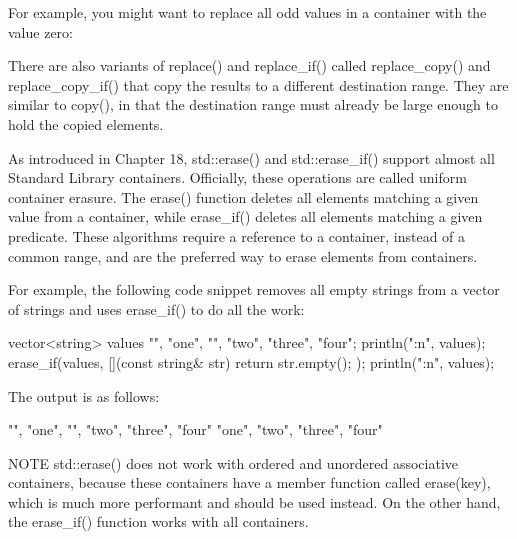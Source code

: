 For example, you might want to replace all odd values in a container with the value zero:


There are also variants of replace() and replace\_if() called replace\_copy() and replace\_copy\_if() that copy the results to a different destination range. They are similar to copy(), in that the destination range must already be large enough to hold the copied elements.


As introduced in Chapter 18, std::erase() and std::erase\_if() support almost all Standard Library containers. Officially, these operations are called uniform container erasure. The erase() function deletes all elements matching a given value from a container, while erase\_if() deletes all elements matching a given predicate. These algorithms require a reference to a container, instead of a common range, and are the preferred way to erase elements from containers.

For example, the following code snippet removes all empty strings from a vector of strings and uses erase\_if() to do all the work:

\begin{cpp}
vector<string> values {"", "one", "", "two", "three", "four"};
println("{:n}", values);
erase_if(values, [](const string& str){ return str.empty(); });
println("{:n}", values);
\end{cpp}

The output is as follows:

\begin{shell}
"", "one", "", "two", "three", "four"
"one", "two", "three", "four"
\end{shell}

\begin{myNotic}{NOTE}
std::erase() does not work with ordered and unordered associative containers, because these containers have a member function called erase(key), which is much more performant and should be used instead. On the other hand, the erase\_if() function works with all containers.
\end{myNotic}


